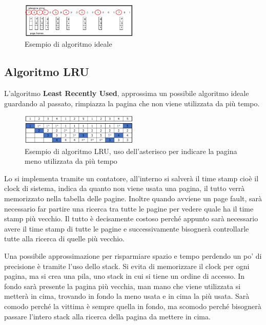 \documentclass[a4paper, 12pt]{book}
\begin{document}
\begin{figure}
    \includegraphics[width=0.5\textwidth]{ideale.png}
    \caption{Esempio di algoritmo ideale}
\end{figure}

\subsection{Algoritmo LRU}

L'algoritmo \textbf{Least Recently Used}, approssima un possibile algoritmo ideale guardando al passato, rimpiazza la pagina
che non viene utilizzata da più tempo.

\begin{figure}
    \includegraphics[width=0.5\textwidth]{LRU.png}
    \caption{Esempio di algoritmo LRU, uso dell'asterisco per indicare la pagina meno utilizzata da più tempo}
\end{figure}

Lo si implementa tramite un contatore, all'interno si salverà il time stamp cioè il clock di sistema, indica da quanto non viene 
usata una pagina, il tutto verrà memorizzato nella tabella delle pagine. Inoltre quando avviene un page fault, sarà necessario far 
partire una ricerca tra tutte le pagine per vedere quale ha il time stamp più vecchio. Il tutto è decisamente costoso perché appunto 
sarà necessario avere il time stamp di tutte le pagine e successivamente bisognerà controllarle tutte alla ricerca di quelle più 
vecchio.

Una possibile approssimazione per risparmiare spazio e tempo perdendo un po' di precisione è tramite l'uso dello stack. Si evita di 
memorizzare il clock per ogni pagina, ma si crea una pila, uno stack in cui si tiene un ordine di accesso. In fondo sarà presente 
la pagina più vecchia, man mano che viene utilizzata si metterà in cima, trovando in fondo la meno usata e in cima la più usata. Sarà
comodo perché la vittima è sempre quella in fondo, ma scomodo perché bisognerà passare l'intero stack alla ricerca della pagina 
da mettere in cima.
\end{document}
